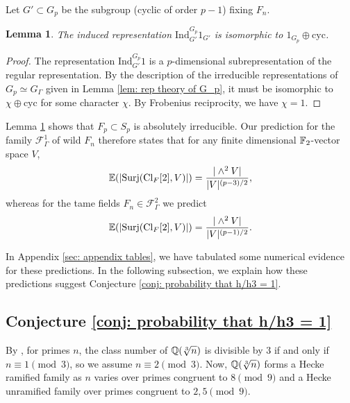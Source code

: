 \documentclass[11pt,a4paper]{amsart}
\def\F{{\rm \mathbb{F}}}
\def\Q{{\rm \mathbb{Q}}}
\def\Cl{{\rm Cl}}
\numberwithin{equation}{section}
\newtheorem{lemma}[theorem]{Lemma}
\begin{document}
Let $G' \subset G_p$ be the subgroup (cyclic of order $p-1$) fixing $F_n$. 
\begin{lemma}\label{lem: kummer is absolutely irreducible}
    The induced representation $\mathrm{Ind}_{G'}^{G_p} 1_{G'}$ is isomorphic to $1_{G_p} \oplus \mathrm{cyc}$. 

\end{lemma}
\begin{proof}
    The representation $\mathrm{Ind}_{G'}^{G_p} 1$ is a $p$-dimensional subrepresentation of the regular representation. By the description of the irreducible representations of $G_p \simeq G_\Gamma$ given in Lemma \ref{lem: rep theory of G_p}, it must be isomorphic to $\chi \oplus \mathrm{cyc}$ for some character $\chi$. By Frobenius reciprocity, we have $\chi = 1$. 
\end{proof}


Lemma \ref{lem: kummer is absolutely irreducible} shows that $F_p \subset S_p$ is absolutely irreducible. Our prediction for the family $\mathcal{F}^1_\Gamma$ of wild $F_n$ therefore states that for any finite dimensional $\F_2$-vector space $V$, 
\begin{equation} \label{eqn: Kummer wild moments}
    \mathbb{E}(|\mathrm{Surj}(\Cl_F[2],V)|) = \dfrac{| \wedge^2 V|}{|V|^{(p-3)/2}},
\end{equation}
whereas for the tame fields $F_n \in \mathcal{F}_\Gamma^2$ we predict 
\begin{equation}\label{eq: Kummer tame moments}
    \mathbb{E}(|\mathrm{Surj}(\Cl_F[2],V)|) = \dfrac{| \wedge^2 V|}{|V|^{(p-1)/2}}.
\end{equation}


In Appendix \ref{sec: appendix tables}, we have tabulated some numerical evidence for these predictions. In the following subsection, we explain how these predictions suggest Conjecture \ref{conj: probability that h/h3 = 1}.
\subsection{Conjecture \ref{conj: probability that h/h3 = 1}}

By \cite{ShanksWilliams}, for primes $n$, the class number of $\Q(\sqrt[3]{n})$ is divisible by $3$ if and only if $n \equiv 1\pmod{3}$, so we assume $n \equiv 2\pmod{3}$. Now, $\Q(\sqrt[3]{n})$ forms a Hecke ramified family as $n$ varies over primes congruent to $8 \pmod{9}$ and a Hecke unramified family over primes congruent to $2,5 \pmod{9}$. 
\end{document}
